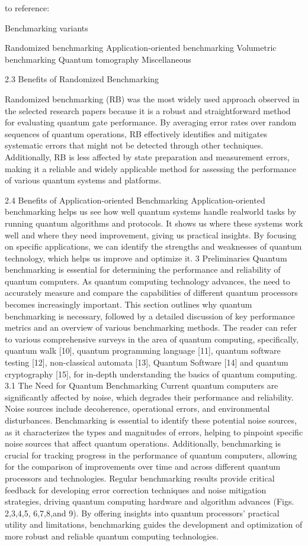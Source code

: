 to reference: \cite{malhotraSystematicReviewQuantum_2024}

Benchmarking variants 

Randomized benchmarking 
Application-oriented benchmarking 
Volumetric benchmarking
Quantum tomography Miscellaneous


2.3 Benefits of Randomized Benchmarking 

Randomized benchmarking (RB) was the most widely used approach observed in the selected research papers because it is a robust and straightforward method for evaluating quantum gate performance. By averaging error rates over random sequences of quantum operations, RB effectively identifies and mitigates systematic errors that might not be detected through other techniques. Additionally, RB is less affected by state preparation and measurement errors, making it a reliable and widely applicable method for assessing the performance of various quantum systems and platforms.


2.4 Benefits of Application-oriented Benchmarking Application-oriented benchmarking helps us see how well quantum systems handle realworld tasks by running quantum algorithms and protocols. It shows us where these systems work well and where they need improvement, giving us practical insights. By focusing on specific applications, we can identify the strengths and weaknesses of quantum technology, which helps us improve and optimize it. 3 Preliminaries Quantum benchmarking is essential for determining the performance and reliability of quantum computers. As quantum computing technology advances, the need to accurately measure and compare the capabilities of different quantum processors becomes increasingly important. This section outlines why quantum benchmarking is necessary, followed by a detailed discussion of key performance metrics and an overview of various benchmarking methods. The reader can refer to various comprehensive surveys in the area of quantum computing, specifically, quantum walk [10], quantum programming language [11], quantum software testing [12], non-classical automata [13], Quantum Software [14] and quantum cryptography [15], for in-depth understanding the basics of quantum computing. 3.1 The Need for Quantum Benchmarking Current quantum computers are significantly affected by noise, which degrades their performance and reliability. Noise sources include decoherence, operational errors, and environmental disturbances. Benchmarking is essential to identify these potential noise sources, as it characterizes the types and magnitudes of errors, helping to pinpoint specific noise sources that affect quantum operations. Additionally, benchmarking is crucial for tracking progress in the performance of quantum computers, allowing for the comparison of improvements over time and across different quantum processors and technologies. Regular benchmarking results provide critical feedback for developing error correction techniques and noise mitigation strategies, driving quantum computing hardware and algorithm advances (Figs. 2,3,4,5, 6,7,8,and 9). By offering insights into quantum processors’ practical utility and limitations, benchmarking guides the development and optimization of more robust and reliable quantum computing technologies.


